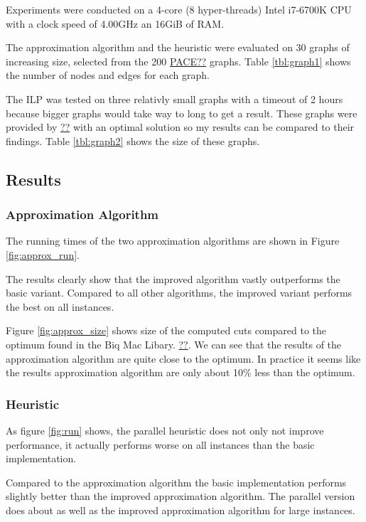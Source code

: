 \documentclass[twocolumn]{article}
\begin{document}
Experiments were conducted on a 4-core (8 hyper-threads) Intel i7-6700K CPU with a clock speed
of 4.00GHz an 16GiB of RAM.

The approximation algorithm and the heuristic were evaluated on 30 graphs of increasing size,
selected from the 200 \href{00}{PACE??} graphs.
Table \ref{tbl:graph1} shows the number of nodes and edges for each graph.

The ILP was tested on three relativly small graphs with a timeout of 2 hours
because bigger graphs would take way to long to get a result.
These graphs were provided by \href{??}{??} with an optimal solution so my results can be compared to their findings.
Table \ref{tbl:graph2} shows the size of these graphs.


\subsection{Results}%
\label{sub:Results}

\subsubsection{Approximation Algorithm}
The running times of the two approximation algorithms are shown in Figure \ref{fig:approx_run}.

The results clearly show that the improved algorithm vastly outperforms the basic variant.
Compared to all other algorithms, the improved variant performs the best on all instances.

Figure \ref{fig:approx_size} shows size of the computed cuts compared to the optimum found in the Biq Mac Libary. \href{??}{??}.
We can see that the results of the approximation algorithm are quite close to the optimum.
In practice it seems like the results approximation algorithm are only about 10\% less than the optimum.

\subsubsection{Heuristic}
As figure \ref{fig:run} shows, the parallel heuristic does not only not improve performance,
it actually performs worse on all instances than the basic implementation.

Compared to the approximation algorithm the basic implementation performs slightly better
than the improved approximation algorithm.
The parallel version does about as well as the improved approximation algorithm for large
instances.
\end{document}
